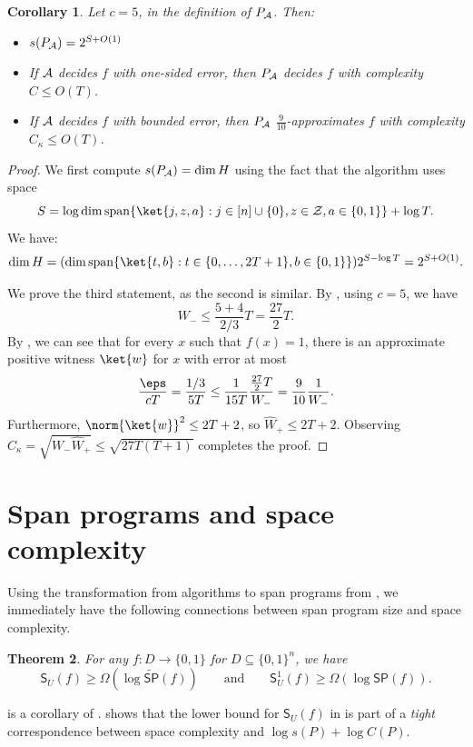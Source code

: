 \documentclass[11pt]{article}
\numberwithin{equation}{section}
\newtheorem{theorem}{Theorem}[section]
\newtheorem{corollary}[theorem]{Corollary}
\theoremstyle{definition}
\theoremstyle{plain}
\begin{document}
\begin{corollary}
Let $c=5$, in the definition of $P_{\cal A}$. Then:
\begin{itemize}
\item $s(P_{\cal A})=2^{S+O(1)}$
\item If $\cal A$ decides $f$ with one-sided error, then $P_{\cal A}$ decides $f$ with complexity $C\leq O(T)$.
\item If $\cal A$ decides $f$ with bounded error, then $P_{\cal A}$ $\frac{9}{10}$-approximates $f$ with complexity $C_\kappa\leq O(T)$.
\end{itemize}
\end{corollary}
\begin{proof}
We first compute $s(P_{\cal A})=\dim H$ using the fact that the algorithm uses space 
$$S=\log\dim\mathrm{span}\{\ket{j,z,a}:j\in [n]\cup\{0\},z\in{\cal Z},a\in\{0,1\}\}+\log T.$$
We have:
\begin{align*}
\dim H = (\dim\mathrm{span}\{\ket{t,b}:t\in\{0,\dots,2T+1\},b\in\{0,1\}\})2^{S-\log T}
 = 2^{S+O(1)}.
\end{align*}

We prove the third statement, as the second is similar. By , using $c=5$, we have 
$$W_-\leq \frac{5+4}{2/3}T = \frac{27}{2}T.$$
By , we can see that for every $x$ such that $f(x)=1$, there is an approximate positive witness $\ket{w}$ for $x$ with error 
at most %
$$\frac{\eps}{cT} = \frac{1/3}{5T}\leq \frac{1}{15T}\frac{\frac{27}{2}T}{W_-}=\frac{9}{10}\frac{1}{W_-}.$$
Furthermore, $\norm{\ket{w}}^2\leq 2T+2$, so $\widehat{W}_+\leq 2T+2$.
Observing
$C_{\kappa} = \sqrt{W_-\widehat{W}_+}\leq \sqrt{27T(T+1)}$ completes the proof.
\end{proof}


\section{Span programs and space complexity}\label{sec:span-space}

Using the transformation from  
algorithms to span programs from , we immediately have the following connections between span program size and space complexity.


\begin{theorem}\label{thm:span-space-lower-bound}
For any $f:D\rightarrow \{0,1\}$ for $D\subseteq \{0,1\}^n$, we have 
\begin{equation*}
\mathsf{S}_U(f)\geq \Omega\left(\log \widetilde{\mathsf{SP}}(f)\right) \qquad\mbox{and}\qquad \mathsf{S}_U^1(f)\geq \Omega\left(\log \mathsf{SP}(f)\right).
\end{equation*}
\end{theorem}
\noindent {} is a corollary of . 
 shows that the lower bound for $\mathsf{S}_U(f)$ in  is part of a \emph{tight} correspondence between space complexity and $\log s(P)+\log C(P)$. 
\end{document}
